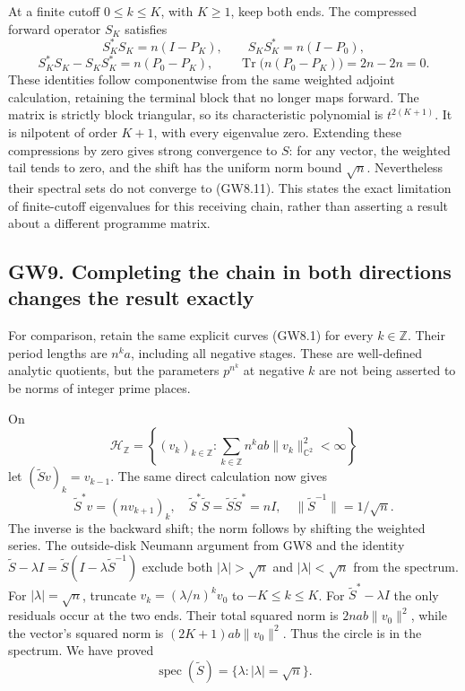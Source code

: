 At a finite cutoff \(0\le k\le K\), with \(K\ge1\), keep both ends. The
compressed forward operator \(S_K\) satisfies \[
S_K^*S_K=n(I-P_K),\qquad S_KS_K^*=n(I-P_0),
\] \[
S_K^*S_K-S_KS_K^*=n(P_0-P_K),\qquad
\operatorname{Tr}\bigl(n(P_0-P_K)\bigr)=2n-2n=0.
\tag{GW8.14}
\] These identities follow componentwise from the same weighted adjoint
calculation, retaining the terminal block that no longer maps forward.
The matrix is strictly block triangular, so its characteristic
polynomial is \(t^{2(K+1)}\). It is nilpotent of order \(K+1\), with
every eigenvalue zero. Extending these compressions by zero gives strong
convergence to \(S\): for any vector, the weighted tail tends to zero,
and the shift has the uniform norm bound \(\sqrt n\). Nevertheless their
spectral sets do not converge to (GW8.11). This states the exact
limitation of finite-cutoff eigenvalues for this receiving chain, rather
than asserting a result about a different programme matrix.

\subsection{GW9. Completing the chain in both directions changes the
result
exactly}\label{gw20260924-gw9.-completing-the-chain-in-both-directions-changes-the-result-exactly}

For comparison, retain the same explicit curves (GW8.1) for every
\(k\in\mathbb Z\). Their period lengths are \(n^ka\), including all
negative stages. These are well-defined analytic quotients, but the
parameters \(p^{n^k}\) at negative \(k\) are not being asserted to be
norms of integer prime places.

On \[
\mathcal H_{\mathbb Z}=\left\{(v_k)_{k\in\mathbb Z}:
\sum_{k\in\mathbb Z}n^kab\|v_k\|_{\mathbb C^2}^2<\infty\right\}
\] let \((\widetilde Sv)_k=v_{k-1}\). The same direct calculation now
gives \[
\widetilde S^*v=(nv_{k+1})_k,
\quad\widetilde S^*\widetilde S=\widetilde S\widetilde S^*=nI,
\quad\|\widetilde S^{-1}\|=1/\sqrt n.
\tag{GW9.1}
\] The inverse is the backward shift; the norm follows by shifting the
weighted series. The outside-disk Neumann argument from GW8 and the
identity
\(\widetilde S-\lambda I=\widetilde S(I-\lambda\widetilde S^{-1})\)
exclude both \(|\lambda|>\sqrt n\) and \(|\lambda|<\sqrt n\) from the
spectrum. For \(|\lambda|=\sqrt n\), truncate \(v_k=(\lambda/n)^k v_0\)
to \(-K\le k\le K\). For \(\widetilde S^*-\lambda I\) the only residuals
occur at the two ends. Their total squared norm is \(2nab\|v_0\|^2\),
while the vector's squared norm is \((2K+1)ab\|v_0\|^2\). Thus the
circle is in the spectrum. We have proved \[
\operatorname{spec}(\widetilde S)=\{\lambda:|\lambda|=\sqrt n\}.
\tag{GW9.2}
\]

